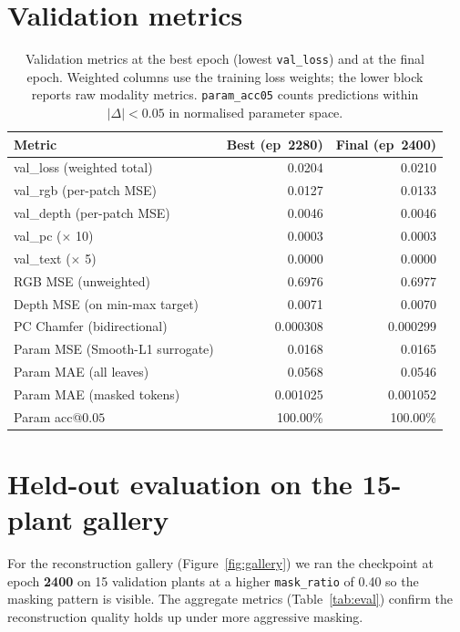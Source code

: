 \documentclass[11pt,a4paper]{article}
\begin{document}
\section{Validation metrics}
\begin{table}[H]
\centering
\caption{Validation metrics at the best epoch (lowest \texttt{val\_loss}) and at the final epoch. Weighted columns use the training loss weights; the lower block reports raw modality metrics. \texttt{param\_acc05} counts predictions within $|\Delta| < 0.05$ in normalised parameter space.}
\label{tab:metrics}
\begin{tabular}{lrr}
\toprule
Metric & Best (ep~2280) & Final (ep~2400) \\
\midrule
val\_loss (weighted total) & 0.0204 & 0.0210 \\
val\_rgb (per-patch MSE) & 0.0127 & 0.0133 \\
val\_depth (per-patch MSE) & 0.0046 & 0.0046 \\
val\_pc ($\times$ 10) & 0.0003 & 0.0003 \\
val\_text ($\times$ 5) & 0.0000 & 0.0000 \\
\midrule
RGB MSE (unweighted) & 0.6976 & 0.6977 \\
Depth MSE (on min-max target) & 0.0071 & 0.0070 \\
PC Chamfer (bidirectional) & 0.000308 & 0.000299 \\
Param MSE (Smooth-L1 surrogate) & 0.0168 & 0.0165 \\
Param MAE (all leaves) & 0.0568 & 0.0546 \\
Param MAE (masked tokens) & 0.001025 & 0.001052 \\
Param acc@$0.05$ & 100.00\% & 100.00\% \\
\bottomrule
\end{tabular}
\end{table}

\section{Held-out evaluation on the 15-plant gallery}
For the reconstruction gallery (Figure~\ref{fig:gallery}) we ran the checkpoint at epoch \textbf{2400} on 15 validation plants at a higher \texttt{mask\_ratio} of 0.40 so the masking pattern is visible. The aggregate metrics (Table~\ref{tab:eval}) confirm the reconstruction quality holds up under more aggressive masking.
\end{document}
